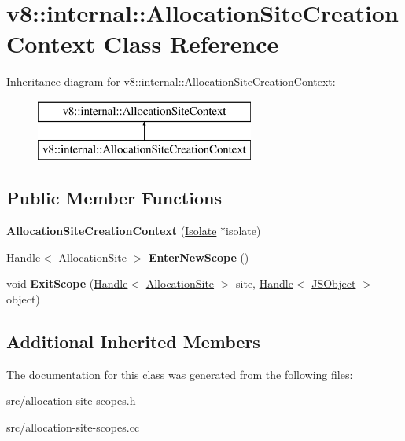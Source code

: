 \hypertarget{classv8_1_1internal_1_1_allocation_site_creation_context}{}\section{v8\+:\+:internal\+:\+:Allocation\+Site\+Creation\+Context Class Reference}
\label{classv8_1_1internal_1_1_allocation_site_creation_context}
Inheritance diagram for v8\+:\+:internal\+:\+:Allocation\+Site\+Creation\+Context\+:\begin{figure}[H]
\begin{center}
\leavevmode
\includegraphics[height=2.000000cm]{classv8_1_1internal_1_1_allocation_site_creation_context}
\end{center}
\end{figure}
\subsection*{Public Member Functions}
\begin{DoxyCompactItemize}
\item 
\hypertarget{classv8_1_1internal_1_1_allocation_site_creation_context_a159a45da25ad238b0b67ec380121780e}{}{\bfseries Allocation\+Site\+Creation\+Context} (\hyperlink{classv8_1_1internal_1_1_isolate}{Isolate} $\ast$isolate)\label{classv8_1_1internal_1_1_allocation_site_creation_context_a159a45da25ad238b0b67ec380121780e}

\item 
\hypertarget{classv8_1_1internal_1_1_allocation_site_creation_context_ac01c9bd1361ef78f22c301bdfdcb2076}{}\hyperlink{classv8_1_1internal_1_1_handle}{Handle}$<$ \hyperlink{classv8_1_1internal_1_1_allocation_site}{Allocation\+Site} $>$ {\bfseries Enter\+New\+Scope} ()\label{classv8_1_1internal_1_1_allocation_site_creation_context_ac01c9bd1361ef78f22c301bdfdcb2076}

\item 
\hypertarget{classv8_1_1internal_1_1_allocation_site_creation_context_a42deb3f83fd733f54d1a0c32a74f2f46}{}void {\bfseries Exit\+Scope} (\hyperlink{classv8_1_1internal_1_1_handle}{Handle}$<$ \hyperlink{classv8_1_1internal_1_1_allocation_site}{Allocation\+Site} $>$ site, \hyperlink{classv8_1_1internal_1_1_handle}{Handle}$<$ \hyperlink{classv8_1_1internal_1_1_j_s_object}{J\+S\+Object} $>$ object)\label{classv8_1_1internal_1_1_allocation_site_creation_context_a42deb3f83fd733f54d1a0c32a74f2f46}

\end{DoxyCompactItemize}
\subsection*{Additional Inherited Members}


The documentation for this class was generated from the following files\+:\begin{DoxyCompactItemize}
\item 
src/allocation-\/site-\/scopes.\+h\item 
src/allocation-\/site-\/scopes.\+cc\end{DoxyCompactItemize}
